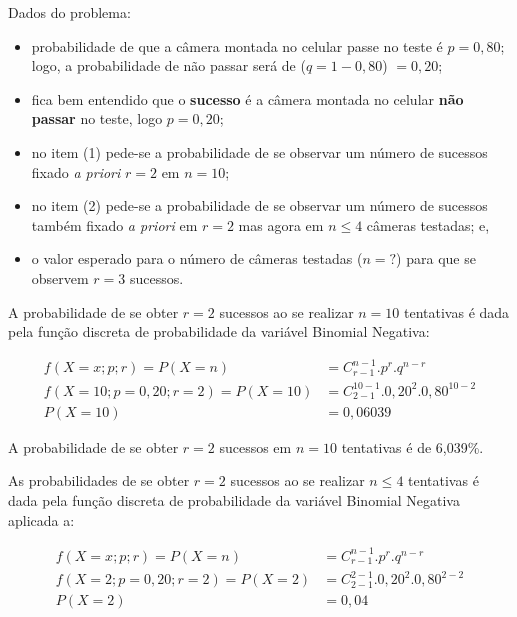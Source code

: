 \documentclass[
]{book}
\providecommand{\tightlist}{%
  \setlength{\itemsep}{0pt}\setlength{\parskip}{0pt}}
\begin{document}
\hfill\break

Dados do problema:

\hfill\break

\begin{itemize}
\tightlist
\item
  probabilidade de que a câmera montada no celular passe no teste é \(p=0,80\); logo, a probabilidade de não passar será de (\(q=1-0,80\)) \(=0,20\);\\
\item
  fica bem entendido que o \textbf{sucesso} é a câmera montada no celular \textbf{não passar} no teste, logo \(p=0,20\);\\
\item
  no item (1) pede-se a probabilidade de se observar um número de sucessos fixado \emph{a priori} \(r=2\) em \(n=10\);\\
\item
  no item (2) pede-se a probabilidade de se observar um número de sucessos também fixado \emph{a priori} em \(r=2\) mas agora em \(n \le 4\) câmeras testadas; e,\\
\item
  o valor esperado para o número de câmeras testadas (\(n=?\)) para que se observem \(r=3\) sucessos.
\end{itemize}

\hfill\break

A probabilidade de se obter \(r=2\) sucessos ao se realizar \(n=10\) tentativas é dada pela função discreta de probabilidade da variável Binomial Negativa:

\begin{align*}
f(X=x; p; r) = P(X=n) & = {C}_{r-1}^{n-1} . {p}^{r}. {q}^{n-r} \\
f(X=10; p=0,20 ; r=2) = P(X=10) & = {C}_{2-1}^{10-1} . {0,20}^{2}. {0,80}^{10-2} \\ 
P(X=10) & = 0,06039
\end{align*}

A probabilidade de se obter \(r=2\) sucessos em \(n=10\) tentativas é de 6,039\%.

\hfill\break

As probabilidades de se obter \(r=2\) sucessos ao se realizar \(n \le 4\) tentativas é dada pela função discreta de probabilidade da variável Binomial Negativa aplicada a:

\begin{align*}
f(X=x; p; r) = P(X=n) & = {C}_{r-1}^{n-1} . {p}^{r}. {q}^{n-r} \\
f(X=2; p=0,20 ; r=2) = P(X=2)  & = {C}_{2-1}^{2-1} . {0,20}^{2}. {0,80}^{2-2} \\ 
P(X=2) & = 0,04
\end{align*}
\end{document}
